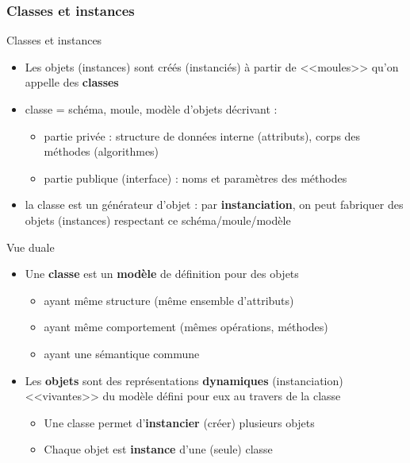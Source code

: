 \subsubsection*{Classes et instances}

\begin{frame}{Classes et instances}
\begin{itemize}
	\item Les objets (instances) sont créés (instanciés) à partir de <<moules>> qu'on appelle des \textbf{classes}
	\item classe = schéma, moule, modèle d'objets décrivant :
	\begin{itemize}
	\item partie privée : structure de données interne (attributs), corps des méthodes (algorithmes)
	\item partie publique (interface) : noms et paramètres des méthodes
	\end{itemize}
	\item la classe est un générateur d'objet : par \textbf{instanciation}, on peut fabriquer des objets (instances) respectant ce schéma/moule/modèle
\end{itemize}
\end{frame}

\begin{frame}{Vue duale}
\begin{itemize}
	\item Une \textbf{classe} est un \textbf{modèle} de définition pour des objets
	\begin{itemize}
		\item ayant même structure (même ensemble d'attributs)
		\item ayant même comportement (mêmes opérations, méthodes)
		\item ayant une sémantique commune
	\end{itemize}
	\item Les \textbf{objets} sont des représentations \textbf{dynamiques} (instanciation)
	<<vivantes>> du modèle défini pour eux au travers de la classe
	\begin{itemize}
		\item Une classe permet d'\textbf{instancier} (créer) plusieurs objets
		\item Chaque objet est \textbf{instance} d'une (seule) classe
	\end{itemize}
\end{itemize}
\end{frame}



